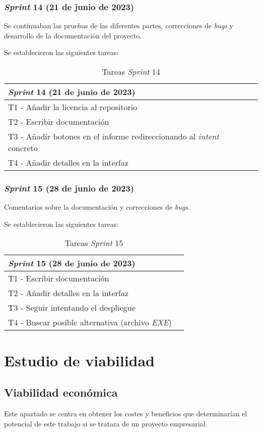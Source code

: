 \subsubsection{\textit{Sprint} 14 (21 de junio de 2023)}
Se continuaban las pruebas de las diferentes partes, correcciones de \textit{bugs} y desarrollo de la documentación del proyecto.

Se establecieron las siguientes tareas:
\begin{table}[H]
\centering
\begin{tabular}{ll}
\toprule
\textit{Sprint} 14 (21 de junio de 2023)   \\
\midrule
T1 - Añadir la licencia al repositorio\\
T2 - Escribir documentación\\
T3 - Añadir botones en el informe redireccionando al \textit{intent} concreto\\
T4 - Añadir detalles en la interfaz\\
\bottomrule
\end{tabular}
\caption{Tareas \textit{Sprint} 14}
\end{table}

\subsubsection{\textit{Sprint} 15 (28 de junio de 2023)}
Comentarios sobre la documentación y correcciones de \textit{bugs}.

Se establecieron las siguientes tareas:
\begin{table}[H]
\centering
\begin{tabular}{ll}
\toprule
\textit{Sprint} 15 (28 de junio de 2023)   \\
\midrule
T1 - Escribir documentación\\
T2 - Añadir detalles en la interfaz\\
T3 - Seguir intentando el despliegue\\
T4 - Buscar posible alternativa (archivo \textit{EXE})\\
\bottomrule
\end{tabular}
\caption{Tareas \textit{Sprint} 15}
\end{table}

\section{Estudio de viabilidad}

\subsection{Viabilidad económica}
Este apartado se centra en obtener los costes y beneficios que determinarían el potencial de este trabajo si se tratara de un proyecto empresarial.

